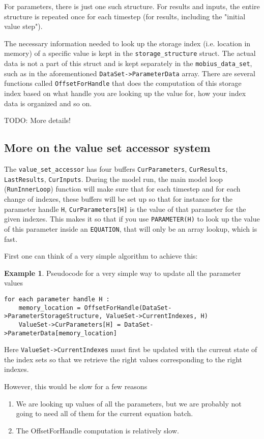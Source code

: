 \documentclass[11pt]{article}
\theoremstyle{definition}
\newtheorem{myexample}{Example}
\newenvironment{example}%
  {\begin{lrbox}{\examplebox}%
   \begin{minipage}{\dimexpr\linewidth-2\fboxsep}
   \begin{myexample}}%
  {\end{myexample}%
   \end{minipage}%
   \end{lrbox}%
   \begin{trivlist}
     \item[]\colorbox{silver}{\usebox\examplebox}
   \end{trivlist}}
\begin{document}
For parameters, there is just one such structure. For results and inputs, the entire structure is repeated once for each timestep (for results, including the "initial value step").

The necessary information needed to look up the storage index (i.e. location in memory) of a specific value is kept in the {\tt storage\_structure} struct. The actual data is not a part of this struct and is kept separately in the {\tt mobius\_data\_set}, such as in the aforementioned {\tt DataSet->ParameterData} array. There are several functions called {\tt OffsetForHandle} that does the computation of this storage index based on what handle you are looking up the value for, how your index data is organized and so on.

TODO: More details!


\subsection{More on the value set accessor system}

The {\tt value\_set\_accessor} has four buffers {\tt CurParameters}, {\tt CurResults}, {\tt LastResults}, {\tt CurInputs}. During the model run, the main model loop ({\tt RunInnerLoop}) function will make sure that for each timestep and for each change of indexes, these buffers will be set up so that for instance for the parameter handle {\tt H}, {\tt CurParameters[H]} is the value of that parameter for the given indexes. This makes it so that if you use {\tt PARAMETER(H)} to look up the value of this parameter inside an {\tt EQUATION}, that will only be an array lookup, which is fast.

First one can think of a very simple algorithm to achieve this:
\begin{example}
Pseudocode for a very simple way to update all the parameter values
\begin{lstlisting}[style = mycpp]
for each parameter handle H :
	memory_location = OffsetForHandle(DataSet->ParameterStorageStructure, ValueSet->CurrentIndexes, H)
	ValueSet->CurParameters[H] = DataSet->ParameterData[memory_location]
\end{lstlisting}
Here {\tt ValueSet->CurrentIndexes} must first be updated with the current state of the index sets so that we retrieve the right values corresponding to the right indexes.
\end{example}

However, this would be slow for a few reasons
\begin{enumerate}[i]
\item We are looking up values of all the parameters, but we are probably not going to need all of them for the current equation batch.
\item The OffsetForHandle computation is relatively slow.
\end{enumerate}
\end{document}
